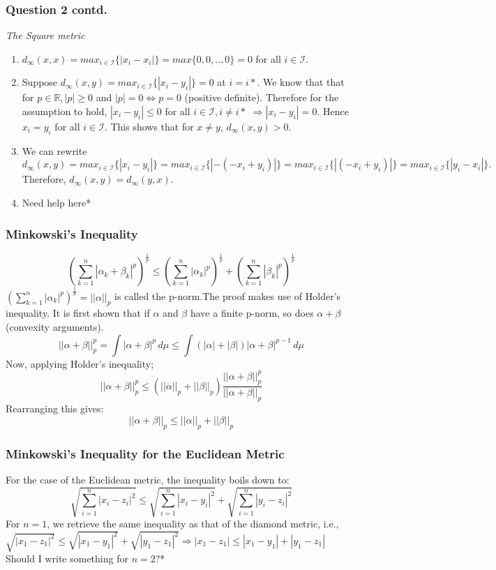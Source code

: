 \begin{frame}
\frametitle{Question 2 contd.}
\textit{The Square metric}\hfill\break
\begin{enumerate}
    \item $d_{\infty}(x,x) = max_{i\in \mathcal{I}}\{|x_i - x_i|\} = max\{0, 0,..,0\} = 0$ for all $i\in \mathcal{I}.$
    \item Suppose $d_{\infty}(x,y) = max_{i\in \mathcal{I}}\{|x_i - y_i|\} = 0$ at $i=i*$. We know that that for $p \in \mathbb{R}, |p|\geq 0$ and $|p| = 0 \iff p = 0$ (positive definite). Therefore for the assumption to hold, $|x_i - y_i| \leq 0$ for all $i \in \mathcal{I}, i\neq i*$ $\Rightarrow |x_i - y_i| = 0$. Hence $x_i = y_i$ for all $i \in \mathcal{I}$. This shows that for $x\neq y$, $d_{\infty}(x,y)>0$.
    \item We can rewrite $d_{\infty}(x,y) = max_{i\in \mathcal{I}}\{|x_i - y_i|\} = max_{i\in \mathcal{I}}\{|- (- x_i + y_i)|\} = max_{i\in \mathcal{I}}\{|(- x_i + y_i)|\} = max_{i\in \mathcal{I}}\{|y_i - x_i|\}.$ Therefore, $d_{\infty}(x,y) = d_{\infty}(y,x).$
    \item Need help here*
\end{enumerate}
\end{frame}

\begin{frame}
\frametitle{Minkowski's Inequality}
\begin{equation*}
    (\sum_{k=1}^{n}|\alpha_k+\beta_k|^p)^\frac{1}{p} \leq (\sum_{k=1}^{n}|\alpha_k|^p)^\frac{1}{p} + (\sum_{k=1}^{n}|\beta_k|^p)^\frac{1}{p}
\end{equation*}
$(\sum_{k=1}^{n}|\alpha_k|^p)^\frac{1}{p} = ||\alpha||_p$ is called the p-norm.The proof makes use of Holder's inequality. It is first shown that if $\alpha$ and $\beta$ have a finite p-norm, so does $\alpha+\beta$ (convexity arguments).
\begin{equation*}
    ||\alpha+\beta||_p^p = \int |\alpha+\beta|^p \,d\mu \leq \int (|\alpha|+|\beta|)|\alpha+\beta|^{p-1} \,d\mu
\end{equation*}
Now, applying Holder's inequality;
\begin{equation}
||\alpha+\beta||_p^p \leq  (||\alpha||_p+||\beta||_p)\frac{||\alpha+\beta||_p^p}{||\alpha+\beta||_p}
\end{equation}
Rearranging this gives:
\begin{equation}
||\alpha+\beta||_p \leq  ||\alpha||_p+||\beta||_p
\end{equation}
\end{frame}

\begin{frame}
\frametitle{Minkowski's Inequality for the Euclidean Metric}
For the case of the Euclidean metric, the inequality boils down to:
\begin{equation*}
    \sqrt{\sum_{i=1}^{n} |x_i - z_i|^2} \leq  \sqrt{\sum_{i=1}^{n} |x_i - y_i|^2} +  \sqrt{\sum_{i=1}^{n} |y_i - z_i|^2}
\end{equation*}
For $n=1$, we retrieve the same inequality as that of the diamond metric, i.e.,
$\sqrt{|x_1 - z_1|^2} \leq  \sqrt{|x_1 - y_1|^2} +  \sqrt{|y_1 - z_1|^2} \Rightarrow|x_1 - z_1|\leq |x_1 - y_1|+|y_1 - z_1|$
\hfill\break
Should I write something for $n=2$?*
\end{frame}